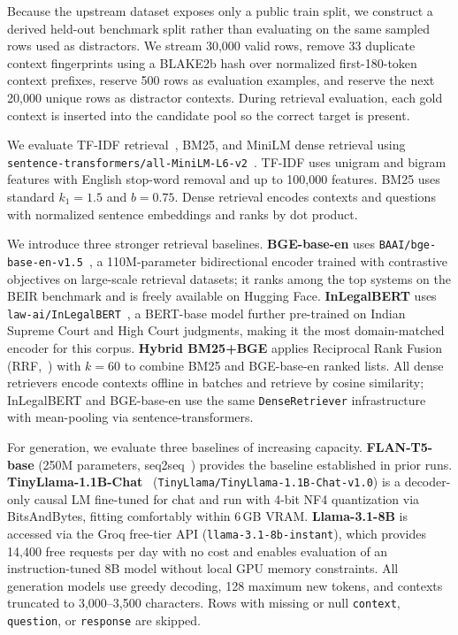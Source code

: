 \documentclass{article}
\begin{document}
Because the upstream dataset exposes only a public train split, we construct a derived held-out benchmark split rather than evaluating on the same sampled rows used as distractors. We stream 30,000 valid rows, remove 33 duplicate context fingerprints using a BLAKE2b hash over normalized first-180-token context prefixes, reserve 500 rows as evaluation examples, and reserve the next 20,000 unique rows as distractor contexts. During retrieval evaluation, each gold context is inserted into the candidate pool so the correct target is present.

We evaluate TF-IDF retrieval~\citep{tfidf}, BM25, and MiniLM dense retrieval using \texttt{sentence-transformers/all-MiniLM-L6-v2}~\citep{minilm}. TF-IDF uses unigram and bigram features with English stop-word removal and up to 100,000 features. BM25 uses standard $k_1=1.5$ and $b=0.75$. Dense retrieval encodes contexts and questions with normalized sentence embeddings and ranks by dot product.

We introduce three stronger retrieval baselines. \textbf{BGE-base-en} uses \texttt{BAAI/bge-base-en-v1.5}~\citep{bge}, a 110M-parameter bidirectional encoder trained with contrastive objectives on large-scale retrieval datasets; it ranks among the top systems on the BEIR benchmark and is freely available on Hugging Face. \textbf{InLegalBERT} uses \texttt{law-ai/InLegalBERT}~\citep{inlegalner}, a BERT-base model further pre-trained on Indian Supreme Court and High Court judgments, making it the most domain-matched encoder for this corpus. \textbf{Hybrid BM25+BGE} applies Reciprocal Rank Fusion (RRF,~\citet{cormack2009reciprocal}) with $k=60$ to combine BM25 and BGE-base-en ranked lists. All dense retrievers encode contexts offline in batches and retrieve by cosine similarity; InLegalBERT and BGE-base-en use the same \texttt{DenseRetriever} infrastructure with mean-pooling via sentence-transformers.

For generation, we evaluate three baselines of increasing capacity. \textbf{FLAN-T5-base} (250M parameters, seq2seq~\citep{flant5}) provides the baseline established in prior runs. \textbf{TinyLlama-1.1B-Chat}~\citep{tinyllama} (\texttt{TinyLlama/TinyLlama-1.1B-Chat-v1.0}) is a decoder-only causal LM fine-tuned for chat and run with 4-bit NF4 quantization via BitsAndBytes, fitting comfortably within 6\,GB VRAM. \textbf{Llama-3.1-8B} is accessed via the Groq free-tier API (\texttt{llama-3.1-8b-instant}), which provides 14,400 free requests per day with no cost and enables evaluation of an instruction-tuned 8B model without local GPU memory constraints. All generation models use greedy decoding, 128 maximum new tokens, and contexts truncated to 3,000--3,500 characters. Rows with missing or null \texttt{context}, \texttt{question}, or \texttt{response} are skipped.
\end{document}

